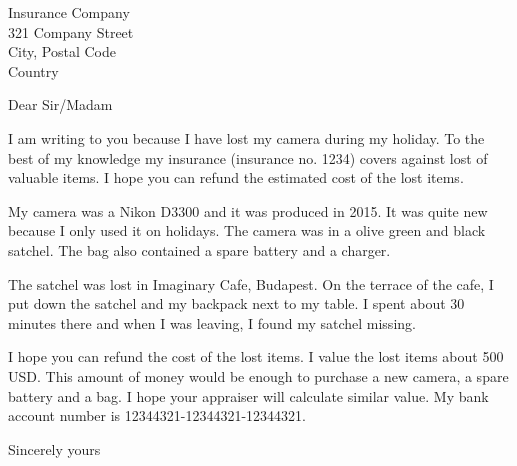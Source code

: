 \documentclass[10pt,a4paper]{letter}
\begin{document}
 
	\begin{letter}{Insurance Company\\ 321 Company Street\\City, Postal Code\\Country} 
		\opening{Dear Sir/Madam} 
	
I am writing to you because I have lost my camera during my holiday. 
To the best of my knowledge my insurance (insurance no. 1234) covers against lost of valuable items. 
I hope you can refund the estimated cost of the lost items. 


My camera was a Nikon D3300 and it was produced in 2015. 
It was quite new because I only used it on holidays. 
The camera was in a olive green and black satchel. 
The bag also contained a spare battery and a charger. 

The satchel was lost in Imaginary Cafe, Budapest. 
On the terrace of the cafe, I put down the satchel and my backpack next to my table. 
I spent about 30 minutes there and when I was leaving, I found my satchel missing. 

I hope you can refund the cost of the lost items. I value the lost items about 500 USD. This amount of money would be enough to purchase a new camera, a spare battery and a bag. I hope your appraiser will calculate similar value. My bank account number is 12344321-12344321-12344321. 
		
		\closing{Sincerely yours} 
	\end{letter} 
\end{document}

